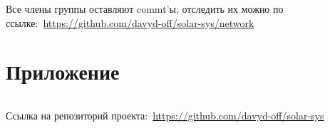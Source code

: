 \documentclass[14pt, oneside]{altsu-report}
\begin{document}
Все члены группы оставляют commt'ы, отследить их можно по ссылке:~\textcolor{blue}{\url{https://github.com/davyd-off/solar-sys/network}}




\newpage
{}
\printbibliography[title={Список использованной литературы}]

\newpage
\chapter*{Приложение}

\begin{code}
\label{code:solar-sys}
\inputminted[mathescape,linenos,frame=lines,breaklines]{Python}{src/SolarSystem.py}
\end{code}
Ссылка на репозиторий проекта:~\textcolor{blue}{\url{https://github.com/davyd-off/solar-sys}}
\end{document}
